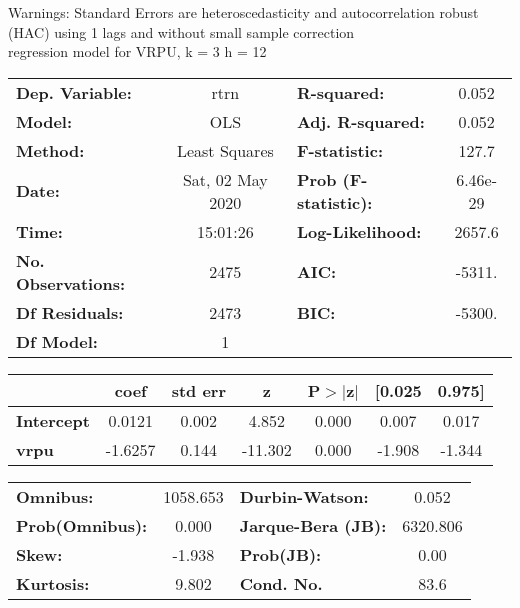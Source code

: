 Warnings: \newline
 [1] Standard Errors are heteroscedasticity and autocorrelation robust (HAC) using 1 lags and without small sample correction\\ 

regression model for VRPU, k = 3 h = 12\begin{center}
\begin{tabular}{lclc}
\toprule
\textbf{Dep. Variable:}    &       rtrn       & \textbf{  R-squared:         } &     0.052   \\
\textbf{Model:}            &       OLS        & \textbf{  Adj. R-squared:    } &     0.052   \\
\textbf{Method:}           &  Least Squares   & \textbf{  F-statistic:       } &     127.7   \\
\textbf{Date:}             & Sat, 02 May 2020 & \textbf{  Prob (F-statistic):} &  6.46e-29   \\
\textbf{Time:}             &     15:01:26     & \textbf{  Log-Likelihood:    } &    2657.6   \\
\textbf{No. Observations:} &        2475      & \textbf{  AIC:               } &    -5311.   \\
\textbf{Df Residuals:}     &        2473      & \textbf{  BIC:               } &    -5300.   \\
\textbf{Df Model:}         &           1      & \textbf{                     } &             \\
\bottomrule
\end{tabular}
\begin{tabular}{lcccccc}
                   & \textbf{coef} & \textbf{std err} & \textbf{z} & \textbf{P$> |$z$|$} & \textbf{[0.025} & \textbf{0.975]}  \\
\midrule
\textbf{Intercept} &       0.0121  &        0.002     &     4.852  &         0.000        &        0.007    &        0.017     \\
\textbf{vrpu}      &      -1.6257  &        0.144     &   -11.302  &         0.000        &       -1.908    &       -1.344     \\
\bottomrule
\end{tabular}
\begin{tabular}{lclc}
\textbf{Omnibus:}       & 1058.653 & \textbf{  Durbin-Watson:     } &    0.052  \\
\textbf{Prob(Omnibus):} &   0.000  & \textbf{  Jarque-Bera (JB):  } & 6320.806  \\
\textbf{Skew:}          &  -1.938  & \textbf{  Prob(JB):          } &     0.00  \\
\textbf{Kurtosis:}      &   9.802  & \textbf{  Cond. No.          } &     83.6  \\
\bottomrule
\end{tabular}
\end{center}

